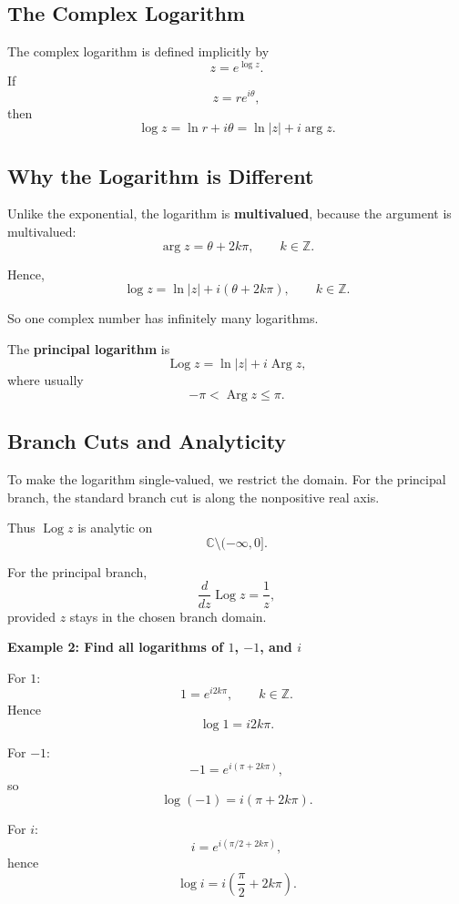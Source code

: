 \subsection{The Complex Logarithm}

\begin{conceptbox}
    The complex logarithm is defined implicitly by
    \[
        z=e^{\log z}.
    \]
    If
    \[
        z=re^{i\theta},
    \]
    then
    \[
        \log z = \ln r + i\theta = \ln|z| + i\arg z.
    \]
\end{conceptbox}

\subsection*{Why the Logarithm is Different}

Unlike the exponential, the logarithm is \textbf{multivalued}, because the argument is multivalued:
\[
    \arg z = \theta + 2k\pi,
    \qquad k\in\mathbb{Z}.
\]

Hence,
\[
    \log z = \ln|z| + i(\theta+2k\pi), \qquad k\in\mathbb{Z}.
\]

So one complex number has infinitely many logarithms.

\begin{conceptbox}
    The \textbf{principal logarithm} is
    \[
        \operatorname{Log} z = \ln|z| + i\operatorname{Arg} z,
    \]
    where usually
    \[
        -\pi<\operatorname{Arg} z\le \pi.
    \]
\end{conceptbox}

\subsection*{Branch Cuts and Analyticity}

To make the logarithm single-valued, we restrict the domain. For the principal branch, the standard branch cut is along the nonpositive real axis.

Thus $\operatorname{Log} z$ is analytic on
\[
    \mathbb{C}\setminus (-\infty,0].
\]

\begin{conceptbox}
    For the principal branch,
    \[
        \frac{d}{dz}\operatorname{Log} z = \frac{1}{z},
    \]
    provided $z$ stays in the chosen branch domain.
\end{conceptbox}

\begin{examplebox}
    \textbf{Example 2: Find all logarithms of $1$, $-1$, and $i$}

    For $1$:
    \[
        1=e^{i2k\pi},
        \qquad k\in\mathbb{Z}.
    \]
    Hence
    \[
        \log 1 = i2k\pi.
    \]

    For $-1$:
    \[
        -1=e^{i(\pi+2k\pi)},
    \]
    so
    \[
        \log(-1)=i(\pi+2k\pi).
    \]

    For $i$:
    \[
        i=e^{i(\pi/2+2k\pi)},
    \]
    hence
    \[
        \log i = i\left(\frac{\pi}{2}+2k\pi\right).
    \]
\end{examplebox}

